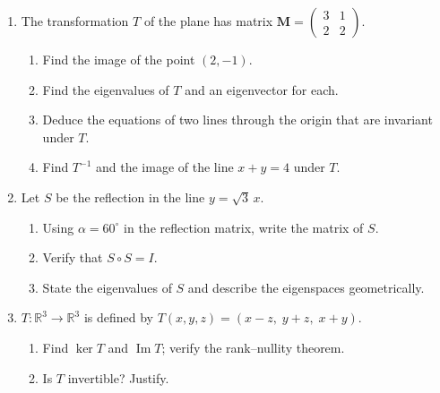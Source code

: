 \documentclass[11pt]{article}
\begin{document}
\begin{exercice}
\begin{enumerate}
    \item The transformation $T$ of the plane has matrix $\mathbf{M} = \begin{pmatrix} 3 & 1 \\ 2 & 2 \end{pmatrix}$.
        \begin{enumerate}
            \item Find the image of the point $(2, -1)$.
            \item Find the eigenvalues of $T$ and an eigenvector for each.
            \item Deduce the equations of two lines through the origin that are invariant under $T$.
            \item Find $T^{-1}$ and the image of the line $x + y = 4$ under $T$.
        \end{enumerate}
    \item Let $S$ be the reflection in the line $y = \sqrt{3}\,x$.
        \begin{enumerate}
            \item Using $\alpha = 60^\circ$ in the reflection matrix, write the matrix of $S$.
            \item Verify that $S\circ S = I$.
            \item State the eigenvalues of $S$ and describe the eigenspaces geometrically.
        \end{enumerate}
    \item $T : \mathbb{R}^3 \to \mathbb{R}^3$ is defined by $T(x,y,z) = (x - z,\; y + z,\; x + y)$.
        \begin{enumerate}
            \item Find $\ker T$ and $\operatorname{Im} T$; verify the rank--nullity theorem.
            \item Is $T$ invertible? Justify.
        \end{enumerate}
\end{enumerate}
\end{exercice}
\end{document}
